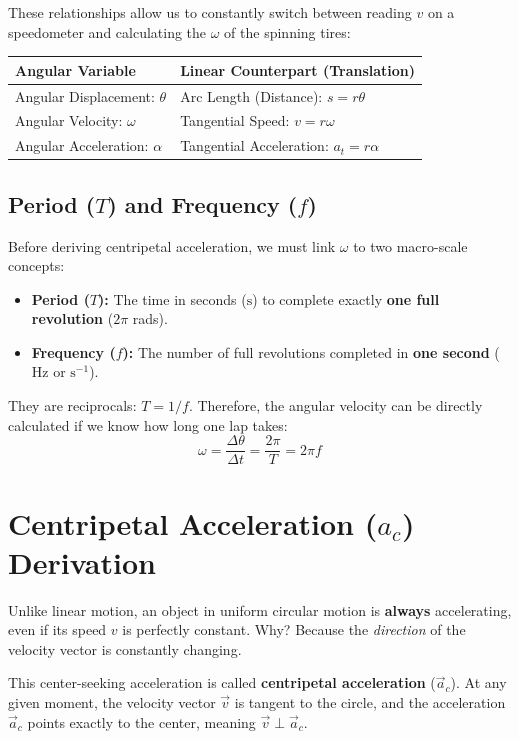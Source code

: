 \documentclass{article}
\begin{document}
These relationships allow us to constantly switch between reading $v$ on a speedometer and calculating the $\omega$ of the spinning tires:

\begin{table}[h!]
\centering
\begin{tabular}{ll}
\toprule
\textbf{Angular Variable} & \textbf{Linear Counterpart (Translation)} \\ \midrule
Angular Displacement: $\theta$ & Arc Length (Distance): $s = r\theta$ \\
Angular Velocity: $\omega$ & Tangential Speed: $v = r\omega$ \\
Angular Acceleration: $\alpha$ & Tangential Acceleration: $a_t = r\alpha$ \\ \bottomrule
\end{tabular}
\end{table}

\subsection{Period ($T$) and Frequency ($f$)}
Before deriving centripetal acceleration, we must link $\omega$ to two macro-scale concepts:
\begin{itemize}
    \item \textbf{Period ($T$):} The time in seconds ($\text{s}$) to complete exactly \textbf{one full revolution} ($2\pi$ rads).
    \item \textbf{Frequency ($f$):} The number of full revolutions completed in \textbf{one second} ($\text{Hz}$ or $\text{s}^{-1}$).
\end{itemize}
They are reciprocals: $T = 1/f$. Therefore, the angular velocity can be directly calculated if we know how long one lap takes:
\begin{equation}
    \omega = \frac{\Delta \theta}{\Delta t} = \frac{2\pi}{T} = 2\pi f
\end{equation}

\section{Centripetal Acceleration ($a_c$) Derivation}

Unlike linear motion, an object in uniform circular motion is \textbf{always} accelerating, even if its speed $v$ is perfectly constant. Why? Because the \emph{direction} of the velocity vector is constantly changing. 

This center-seeking acceleration is called \textbf{centripetal acceleration} ($\vec{a}_c$). At any given moment, the velocity vector $\vec{v}$ is tangent to the circle, and the acceleration $\vec{a}_c$ points exactly to the center, meaning $\vec{v} \perp \vec{a}_c$.
\end{document}
